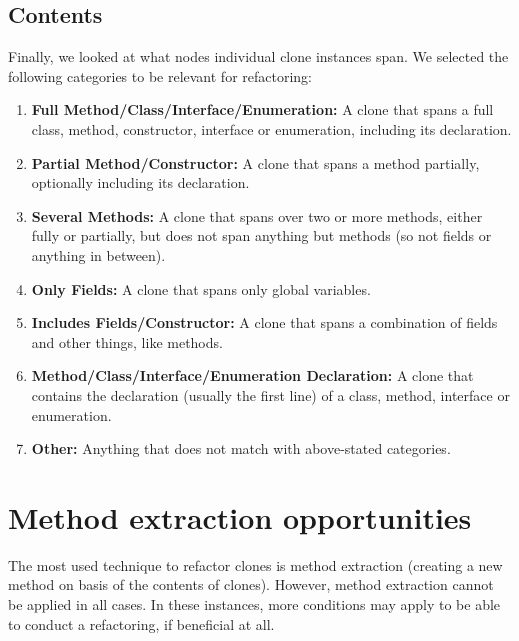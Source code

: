 
\subsection{Contents}\label{sec:setupcontents}
Finally, we looked at what nodes individual clone instances span. We selected the following categories to be relevant for refactoring:
\begin{enumerate}
  \item \textbf{Full Method/Class/Interface/Enumeration:} A clone that spans a full class, method, constructor, interface or enumeration, including its declaration.
  \item \textbf{Partial Method/Constructor:} A clone that spans a method partially, optionally including its declaration.
  \item \textbf{Several Methods:} A clone that spans over two or more methods, either fully or partially, but does not span anything but methods (so not fields or anything in between).
  \item \textbf{Only Fields:} A clone that spans only global variables.
  \item \textbf{Includes Fields/Constructor:} A clone that spans a combination of fields and other things, like methods.
  \item \textbf{Method/Class/Interface/Enumeration Declaration:} A clone that contains the declaration (usually the first line) of a class, method, interface or enumeration.
  \item \textbf{Other:} Anything that does not match with above-stated categories.
\end{enumerate}


\section{Method extraction opportunities}\label{sec:refactorabilitysetup}
The most used technique to refactor clones is method extraction (creating a new method on basis of the contents of clones). However, method extraction cannot be applied in all cases. In these instances, more conditions may apply to be able to conduct a refactoring, if beneficial at all.

